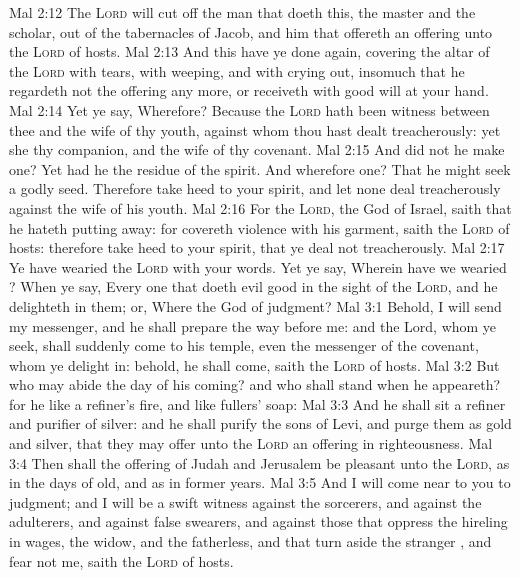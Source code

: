 \vs Mal 2:12 The \textsc{Lord} will cut off the man that doeth this, the master and the scholar, out of the tabernacles of Jacob, and him that offereth an offering unto the \textsc{Lord} of hosts.
\vs Mal 2:13 And this have ye done again, covering the altar of the \textsc{Lord} with tears, with weeping, and with crying out, insomuch that he regardeth not the offering any more, or receiveth  with good will at your hand.
\vs Mal 2:14 Yet ye say, Wherefore? Because the \textsc{Lord} hath been witness between thee and the wife of thy youth, against whom thou hast dealt treacherously: yet  she thy companion, and the wife of thy covenant.
\vs Mal 2:15 And did not he make one? Yet had he the residue of the spirit. And wherefore one? That he might seek a godly seed. Therefore take heed to your spirit, and let none deal treacherously against the wife of his youth.
\vs Mal 2:16 For the \textsc{Lord}, the God of Israel, saith that he hateth putting away: for  covereth violence with his garment, saith the \textsc{Lord} of hosts: therefore take heed to your spirit, that ye deal not treacherously.
\vs Mal 2:17 Ye have wearied the \textsc{Lord} with your words. Yet ye say, Wherein have we wearied ? When ye say, Every one that doeth evil  good in the sight of the \textsc{Lord}, and he delighteth in them; or, Where  the God of judgment?
\vs Mal 3:1 Behold, I will send my messenger, and he shall prepare the way before me: and the Lord, whom ye seek, shall suddenly come to his temple, even the messenger of the covenant, whom ye delight in: behold, he shall come, saith the \textsc{Lord} of hosts.
\vs Mal 3:2 But who may abide the day of his coming? and who shall stand when he appeareth? for he  like a refiner's fire, and like fullers' soap:
\vs Mal 3:3 And he shall sit  a refiner and purifier of silver: and he shall purify the sons of Levi, and purge them as gold and silver, that they may offer unto the \textsc{Lord} an offering in righteousness.
\vs Mal 3:4 Then shall the offering of Judah and Jerusalem be pleasant unto the \textsc{Lord}, as in the days of old, and as in former years.
\vs Mal 3:5 And I will come near to you to judgment; and I will be a swift witness against the sorcerers, and against the adulterers, and against false swearers, and against those that oppress the hireling in  wages, the widow, and the fatherless, and that turn aside the stranger , and fear not me, saith the \textsc{Lord} of hosts.
